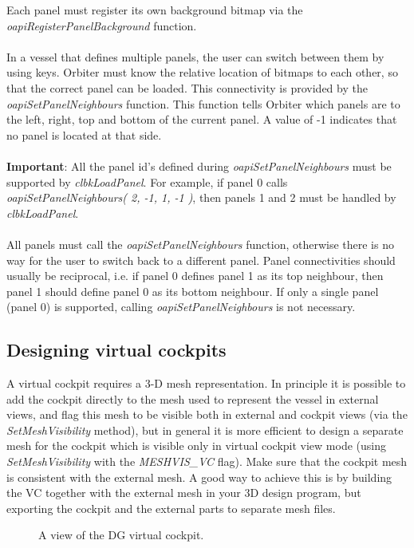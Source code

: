 \documentclass[Orbiter Developer Manual.tex]{subfiles}
\begin{document}
\noindent
Each panel must register its own background bitmap via the \textit{oapiRegisterPanelBackground} function.\\
\\
In a vessel that defines multiple panels, the user can switch between them by using \Ctrl\DArrow\UArrow\RArrow\LArrow keys. Orbiter must know the relative location of bitmaps to each other, so that the correct panel can be loaded. This connectivity is provided by the \textit{oapiSetPanelNeighbours} function. This function tells Orbiter which panels are to the left, right, top and bottom of the current panel. A value of -1 indicates that no panel is located at that side.\\
\\
\textbf{Important}: All the panel id's defined during \textit{oapiSetPanelNeighbours} must be supported by \textit{clbkLoadPanel}. For example, if panel 0 calls \textit{oapiSetPanelNeighbours( 2, -1, 1, -1 )}, then panels 1 and 2 must be handled by \textit{clbkLoadPanel}.\\
\\
All panels must call the \textit{oapiSetPanelNeighbours} function, otherwise there is no way for the user to switch back to a different panel. Panel connectivities should usually be reciprocal, i.e. if panel 0 defines panel 1 as its top neighbour, then panel 1 should define panel 0 as its bottom neighbour. If only a single panel (panel 0) is supported, calling \textit{oapiSetPanelNeighbours} is not necessary.


\subsection{Designing virtual cockpits}
\label{ssec:vc_design}
A virtual cockpit requires a 3-D mesh representation. In principle it is possible to add the cockpit directly to the mesh used to represent the vessel in external views, and flag this mesh to be visible both in external and cockpit views (via the \textit{SetMeshVisibility} method), but in general it is more efficient to design a separate mesh for the cockpit which is visible only in virtual cockpit view mode (using \textit{SetMeshVisibility} with the \textit{MESHVIS\_VC} flag). Make sure that the cockpit mesh is consistent with the external mesh. A good way to achieve this is by building the VC together with the external mesh in your 3D design program, but exporting the cockpit and the external parts to separate mesh files.

\begin{figure}[H]
	\centering
	\caption{A view of the DG virtual cockpit.}
\end{figure}
\end{document}
